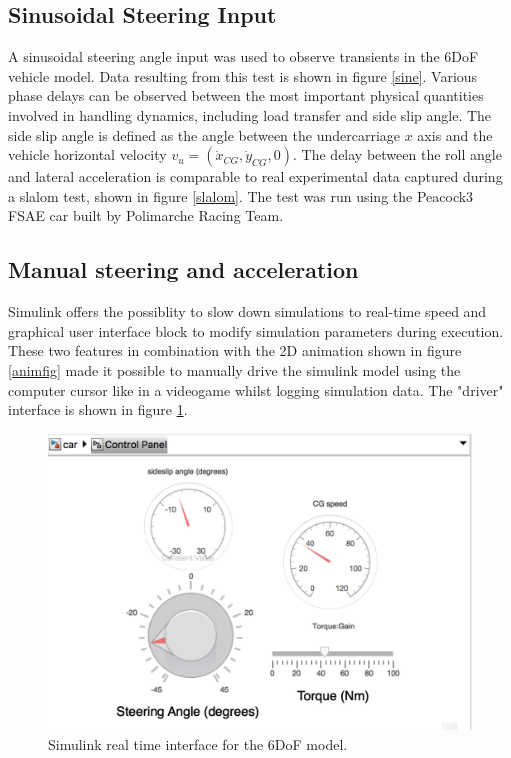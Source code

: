 \subsection{Sinusoidal Steering Input}
A sinusoidal steering angle input was used to observe transients in the 6DoF vehicle model. Data resulting from this test is shown in figure \ref{sine}. Various phase delays can be observed between the most important physical quantities involved in handling dynamics, including load transfer and side slip angle. The side slip angle is defined as the angle between the undercarriage $x$ axis and the vehicle horizontal velocity $v_u = (\dot x_{CG}, \dot y_{CG}, 0)$. The delay between the roll angle and lateral acceleration is comparable to real experimental data captured during a slalom test, shown in figure \ref{slalom}. The test was run using the Peacock3 FSAE car built by Polimarche Racing Team.

\subsection{Manual steering and acceleration}
Simulink offers the possiblity to slow down simulations to real-time speed and
graphical user interface block to modify simulation parameters during execution. These two features in combination with the 2D animation shown in figure \ref{animfig} made it possible to manually drive the simulink model using the computer cursor like in a videogame whilst logging simulation data. The "driver" interface is shown in figure \ref{12mask}.

\begin{figure}[h]
    \centering
    \includegraphics[scale=0.5]{images/controlpanel.png}
    \caption{Simulink real time interface for the 6DoF model.}
	\label{12mask}
\end{figure}


